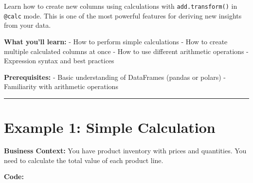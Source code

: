 \documentclass[
  letterpaper,
]{scrbook}
\begin{document}
Learn how to create new columns using calculations with
\texttt{add.transform()} in \texttt{@calc} mode. This is one of the most
powerful features for deriving new insights from your data.

\textbf{What you'll learn:} - How to perform simple calculations - How
to create multiple calculated columns at once - How to use different
arithmetic operations - Expression syntax and best practices

\textbf{Prerequisites:} - Basic understanding of DataFrames (pandas or
polars) - Familiarity with arithmetic operations

\begin{center}\rule{0.5\linewidth}{0.5pt}\end{center}

\section{Example 1: Simple
Calculation}\label{example-1-simple-calculation}

\textbf{Business Context:} You have product inventory with prices and
quantities. You need to calculate the total value of each product line.

\textbf{Code:}
\end{document}
